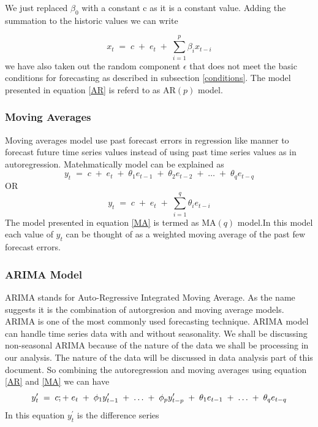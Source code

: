  We just replaced \(\beta_0\) with a constant c as it is a constant value. Adding the summation to the historic values we can write 
 
$$
x_{t}\; =\;c\;+\;e_{t}\;+\;\sum\limits_{i=1}^p\beta_{i}x_{t-i}
$$
we have also taken out the random component \(\epsilon\) that does  not meet the basic conditions for forecasting as described in subsection \ref{conditions}. The model presented  in equation \ref{AR} is referd to as AR\((p)\) model. 
\subsubsection{Moving Averages}
 Moving averages model use past forecast errors in regression like manner to forecast future time series values instead of using past time series values as in autoregression. Matehmatically model can be explained as
 \begin{equation}\label{MA}
 y_{t}\; =\;c\;+\;e_{t}\;+\;\theta_{1}e_{t-1}\;+\;\theta_{2}e_{t-2}\;+\;\dotsc\;+\;\theta_{q}e_{t-q}
\end{equation}
OR
$$
y_{t}\; =\;c\;+\;e_{t}\;+\;\sum\limits_{i=1}^q\theta_{i}e_{t-i}
$$
The model presented  in equation \ref{MA} is termed as MA\((q)\) model.In this model each value of \(y_t\) can be thought of as a weighted moving average of the past few forecast errors.
\subsubsection{ARIMA Model}
ARIMA stands for Auto-Regressive Integrated Moving Average. As the name suggests it is the combination of autorgresion and moving average models. ARIMA is one of the most commonly used forecasting technique. ARIMA model can handle time series data with and without seasonality. We shall be discussing non-seasonal ARIMA because of the nature of the data we shall be processing in our analysis. The nature of the data will be discussed in data analysis part of this document. So combining the autoregression and moving averages using equation \ref{AR} and \ref{MA} we can have 
\begin{equation}\label{ARIMA1}
 y^\prime_{t}\; =\;c\\;+\;e_{t}\;+\;\phi_{1}y^\prime_{t-1}\;+\;\dotsc\;+\;\phi_{p}y^\prime_{t-p}\;+\;\theta_{1}e_{t-1}\;+\;\dotsc\;+\;\theta_{q}e_{t-q}
\end{equation}
In this equation \(y^\prime_t\) is the difference series



 
  






 


